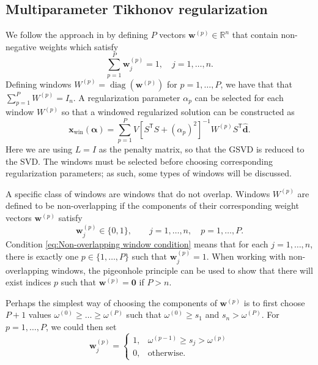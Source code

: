 \documentclass[12pt]{article}
\newcommand{\dVec}{\mathbf{d}}	%
\newcommand{\xVec}{\mathbf{x}}	%
\newcommand{\wVec}{\mathbf{w}}	%
\newcommand{\trans}[1]{{#1}^\mathsf{T}}	%
\newcommand{\inv}[1]{{#1}^{-1}}	%
\DeclareMathOperator{\diag}{diag}	%
\newcommand{\dft}[1]{\widehat{#1}}	%
\newcommand{\regparam}{\alpha}  %
\newcommand{\regparamVec}{\bm{\regparam}}   %
\newcommand{\xWin}{\xVec_{\text{win}}}	%
\newcommand{\zeroVec}{\bm{0}}	%
\newcommand{\singular}{s}	%
\begin{document}
\subsection{Multiparameter Tikhonov regularization} \label{sec:Multiparameter}
We follow the approach in \cite{ChungEasleyOLeary} by defining $P$ vectors $\wVec^{(p)} \in \mathbb{R}^n$ that contain non-negative weights which satisfy
\begin{equation}
\label{eq:Weights}
\sum_{p=1}^{P} \wVec_j^{(p)} = 1, \quad j = 1,\ldots,n.
\end{equation}
Defining windows $W^{(p)} = \diag\left(\wVec^{(p)}\right)$ for $p = 1,\ldots,P$, we have that that $\sum_{p=1}^P W^{(p)} = I_n$. A regularization parameter $\regparam_{p}$ can be selected for each window $W^{(p)}$ so that a windowed regularized solution can be constructed as
\begin{equation}
\label{eq:TikSolWindow}
\xWin(\regparamVec) = \sum_{p=1}^P V\inv{\left[\trans{S}S + (\regparam_{p})^2\right]}W^{(p)}\trans{S}\dft{\dVec}.
\end{equation}
Here we are using $L = I$ as the penalty matrix, so that the GSVD is reduced to the SVD. The windows must be selected before choosing corresponding regularization parameters; as such, some types of windows will be discussed. \par
A specific class of windows are windows that do not overlap. Windows $W^{(p)}$ are defined to be non-overlapping if the components of their corresponding weight vectors $\wVec^{(p)}$ satisfy
\begin{equation}
\label{eq:Non-overlapping window condition}
    \wVec_j^{(p)} \in \{0,1\}, \qquad j = 1,\ldots,n, \quad p = 1,\ldots,P.
\end{equation}
Condition \eqref{eq:Non-overlapping window condition} means that for each $j = 1,\ldots,n$, there is exactly one $p \in \{1,\ldots,P\}$ such that $\wVec_j^{(p)} = 1$. When working with non-overlapping windows, the pigeonhole principle \cite{DummitFoote3} can be used to show that there will exist indices $p$ such that $\wVec^{(p)} = \zeroVec$ if $P > n$. \par
Perhaps the simplest way of choosing the components of $\wVec^{(p)}$ is to first choose $P+1$ values $\omega^{(0)} \geq \ldots \geq \omega^{(P)}$ such that $\omega^{(0)} \geq \singular_1$ and $\singular_n > \omega^{(P)}$. For $p = 1,\ldots,P$, we could then set
\begin{equation}
\label{eq:Non-overlapping windows}
\wVec_j^{(p)} = \begin{cases}
1, & \omega^{(p-1)} \geq \singular_j > \omega^{(p)} \\
0, & \text{otherwise.}
\end{cases}
\end{equation}
\end{document}
